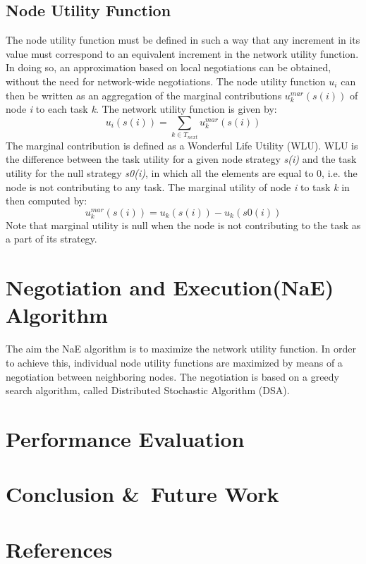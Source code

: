 \documentclass[a4paper]{article}
\begin{document}
\subsection{Node Utility Function}
The node utility function must be defined in such a way that any increment in its value must correspond to an equivalent increment in the network utility function. In doing so, an approximation based on local negotiations can be obtained, without the need for network-wide negotiations. The node utility function $u_i$ can then be written as an aggregation of the marginal contributions $u_k^{mar}(s(i))$ of node \textit{i} to each task \textit{k}. The network utility function is given by:
\begin{equation}
u_i(s(i)) = \sum_{k \in T_{next}} u_k^{mar} (s(i)) 
\end{equation}
The marginal contribution is defined as a Wonderful Life Utility (WLU). WLU is the difference between the task utility for a given node strategy \textit{s(i)} and the task utility for the null strategy \textit{s0(i)}, in which all the elements are equal to 0, i.e. the node is not contributing to any task. The marginal utility of node \textit{i} to task \textit{k} in then computed by:
\begin{equation}
u_k^{mar} (s(i)) = u_k(s(i)) - u_k(s0(i))
\end{equation}
Note that marginal utility is null when the node is not contributing to the task as a part of its strategy.\\

\section{Negotiation and Execution(NaE) Algorithm}
The aim the NaE algorithm is to maximize the network utility function. In order to achieve this, individual node utility functions are maximized by means of a negotiation between neighboring nodes. The negotiation is based on a greedy search algorithm, called Distributed Stochastic Algorithm (DSA). 

\section{Performance Evaluation}
\section{Conclusion \&\ Future Work}
\section{References}
%
\end{document}
